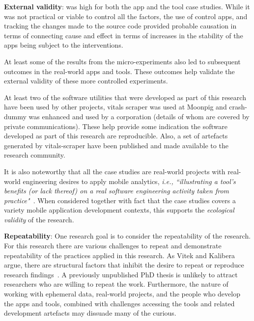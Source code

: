 \textbf{External validity}: was high for both the app and the tool case studies. While it was not practical or viable to control all the factors, the use of control apps, and tracking the changes made to the source code provided probable causation in terms of connecting cause and effect in terms of increases in the stability of the apps being subject to the interventions.

At least some of the results from the micro-experiments also led to subsequent outcomes in the real-world apps and tools. These outcomes help validate the external validity of these more controlled experiments. 

At least two of the software utilities that were developed as part of this research have been used by other projects, vitals scraper was used at Moonpig and crash-dummy was enhanced and used by a corporation (details of whom are covered by private communications). These help provide some indication the software developed as part of this research are reproducible. Also, a set of artefacts generated by vitals-scraper have been published and made available to the research community. 

 It is also noteworthy that all the case studies  are real-world projects with real-world engineering desires to apply mobile analytics, \emph{i.e., ``illustrating a tool’s benefits (or lack thereof) on a real software engineering activity taken from practice"}~\citep[p.126]{Ko2015_a_practical_guide_to_controlled_experiments_of_sw_eng_tools_with_human_participants}. When considered together with fact that the case studies covers a variety mobile application development contexts, this supports the \textit{ecological validity} of the research.

\textbf{Repeatability}: One research goal is to consider the repeatability of the research. For this research there are various challenges to repeat and demonstrate repeatability of the practices applied in this research. As Vitek and Kalibera argue, there are structural factors that inhibit the desire to repeat or reproduce research findings~\citep[p.30]{vivek2012_r3_repeatability_reproducibility_and_rigor}. A previously unpublished PhD thesis is unlikely to attract researchers who are willing to repeat the work. Furthermore, the nature of working with ephemeral data, real-world projects, and the people who develop the apps and tools, combined with challenges accessing the tools and related development artefacts may dissuade many of the curious.

